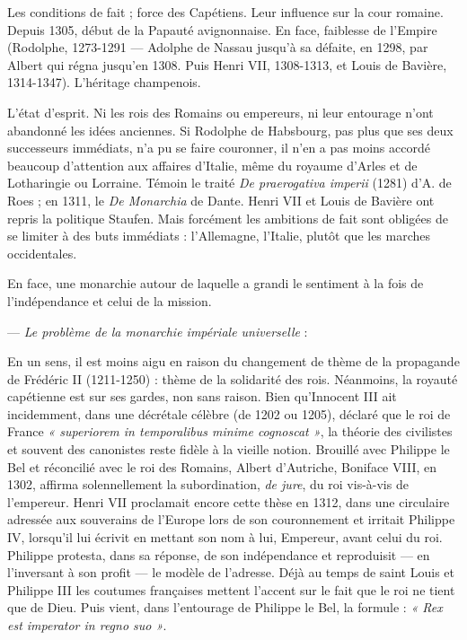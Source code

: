 \documentclass[french,twoside]{book} %
\def\bignobreak{\ifdim\lastskip<\bigskipamount
  \removelastskip\nopagebreak\bigskip\fi}
\newcommand{\labelblock}[1]{\bigskip{\color{rubric}\bfseries\centering #1\par}\bignobreak}
\begin{document}
\labelblock{— {\itshape Deuxième période} : l’expansion française dans l’Empire.}

\noindent Les conditions de fait ; force des Capétiens. Leur influence sur la cour romaine. Depuis 1305, début de la Papauté avignonnaise.  
\label{p32} En face, faiblesse de l’Empire (Rodolphe, 1273-1291 — Adolphe de Nassau jusqu’à sa défaite, en 1298, par Albert qui régna jusqu’en 1308. Puis Henri VII, 1308-1313, et Louis de Bavière, 1314-1347). L’héritage champenois.\par
L’état d’esprit. Ni les rois des Romains ou empereurs, ni leur entourage n’ont abandonné les idées anciennes. Si Rodolphe de Habsbourg, pas plus que ses deux successeurs immédiats, n’a pu se faire couronner, il n’en a pas moins accordé beaucoup d’attention aux affaires d’Italie, même du royaume d’Arles et de Lotharingie ou Lorraine. Témoin le traité {\itshape De praerogativa imperii} (1281) d’A. de Roes ; en 1311, le {\itshape De Monarchia} de Dante. Henri VII et Louis de Bavière ont repris la politique Staufen. Mais forcément les ambitions de fait sont obligées de se limiter à des buts immédiats : l’Allemagne, l’Italie, plutôt que les marches occidentales.\par
En face, une monarchie autour de laquelle a grandi le sentiment à la fois de l’indépendance et celui de la mission.\par
— {\itshape Le problème de la monarchie impériale universelle} :\par
En un sens, il est moins aigu en raison du changement de thème de la propagande de Frédéric II (1211-1250) : thème de la solidarité des rois. Néanmoins, la royauté capétienne est sur ses gardes, non sans raison. Bien qu’Innocent III ait incidemment, dans une décrétale célèbre (de 1202 ou 1205), déclaré que le roi de France \emph{« superiorem in temporalibus minime cognoscat »}, la théorie des civilistes et souvent des canonistes reste fidèle à la vieille notion. Brouillé avec Philippe le Bel et réconcilié avec le roi des Romains, Albert d’Autriche, Boniface VIII, en 1302, affirma solennellement la subordination, {\itshape de jure}, du roi vis-à-vis de l’empereur. Henri VII proclamait encore cette thèse en 1312, dans une circulaire adressée aux souverains de l’Europe lors de son couronnement et irritait Philippe IV, lorsqu’il lui écrivit en mettant son nom à lui, Empereur, avant celui du roi. Philippe protesta, dans sa réponse, de son indépendance et reproduisit — en l’inversant à son profit — le modèle de l’adresse. Déjà au temps de saint Louis et Philippe III les coutumes françaises mettent l’accent sur le fait que le roi ne tient que de Dieu. Puis vient, dans l’entourage de Philippe le Bel, la formule : \emph{« Rex est imperator in regno suo »}.\par
\end{document}
